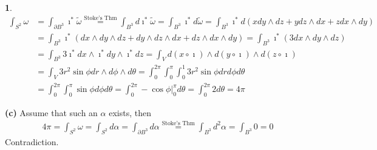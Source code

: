 \documentclass[10.5pt]{article}
\theoremstyle{definition}
\newtheorem{pb}{}
\newcommand{\z}{\imath}
\begin{document}
\begin{pb}
        \begin{align*}
            \int_{S^2} \omega &= \int_{\partial B^3} \z^* \tilde{\omega} \overset{\text{Stoke's Thm}}{=} \int_{B^3} d\z^*{\tilde{\omega}} = \int_{B^3} \z^* d \tilde{\omega} = \int_{B^3} \z^*d(x dy \wedge dz + y dz \wedge dx + z dx \wedge dy) \\
            &= \int_{B^3} \z^* (dx \wedge dy \wedge dz + dy \wedge dz \wedge dx + dz \wedge dx \wedge dy) = \int_{B^3} \z^*(3dx \wedge dy \wedge dz) \\
            &= \int_{B^3} 3 \z^*dx \wedge \z^*dy \wedge \z^* dz 
            = \int_{V} d(x \circ \z) \wedge d(y \circ \z) \wedge d(z \circ \z) \\
            &= \int_{V} 3r^2\sin\phi dr \wedge d\phi \wedge d\theta = \int_0^{2\pi}\int_0^{\pi}\int_0^1 3r^2\sin\phi dr d\phi d\theta \\
            &= \int_0^{2\pi}\int_0^{\pi}\sin\phi d\phi d\theta = \int_0^{2\pi} -\cos\phi\vert_0^\pi d\theta
            = \int_0^{2\pi}2d\theta = 4\pi
        \end{align*}

        \textbf{(c)} Assume that such an \(\alpha\) exists, then
        \begin{align*}
            4\pi = \int_{S^2} \omega = \int_{S^2}d \alpha = \int_{\partial B^3}d \alpha \overset{\text{Stoke's Thm}}{=} \int_{B^3} d^2 \alpha = \int_{B^3} 0 = 0
        \end{align*}
        Contradiction.
    \end{pb}
\end{document}
